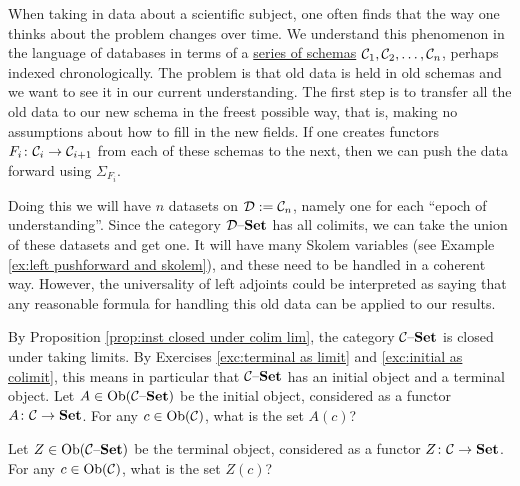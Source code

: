 \documentclass[CT4S-EN-RU]{subfiles}
\begin{document}
\begin{proofRUS}
\end{proofRUS}

\begin{applicationENG}
When taking in data about a scientific subject, one often finds that the way one thinks about the problem changes over time. We understand this phenomenon in the language of databases in terms of a \href{http://en.wikipedia.org/wiki/Schema_evolution}{\text series of schemas} $\mathcal{C}_1,\mathcal{C}_2,\ldots,\mathcal{C}_n$, perhaps indexed chronologically. The problem is that old data is held in old schemas and we want to see it in our current understanding. The first step is to transfer all the old data to our new schema in the freest possible way, that is, making no assumptions about how to fill in the new fields. If one creates functors $F_i\colon\mathcal{C}_i\rightarrow\mathcal{C}_{i+1}$ from each of these schemas to the next, then we can push the data forward using $\Sigma_{F_i}$. 

Doing this we will have $n$ datasets on $\mathcal{D}:=\mathcal{C}_n$, namely one for each “epoch of understanding”. Since the category $\mathcal{D}{\text \textendash}{\mathbf{Set}}$ has all colimits, we can take the union of these datasets and get one. It will have many Skolem variables (see Example \ref{ex:left pushforward and skolem}), and these need to be handled in a coherent way. However, the universality of left adjoints could be interpreted as saying that any reasonable formula for handling this old data can be applied to our results.
\end{applicationENG}

\begin{applicationRUS}
\end{applicationRUS}

\begin{exerciseENG}\label{exc:universal objects in C-set}
By Proposition \ref{prop:inst closed under colim lim}, the category $\mathcal{C}{\text \textendash}{\mathbf{Set}}$ is closed under taking limits. By Exercises \ref{exc:terminal as limit} and \ref{exc:initial as colimit}, this means in particular that $\mathcal{C}{\text \textendash}{\mathbf{Set}}$ has an initial object and a terminal object. 
\sexc Let $A\in\textnormal{Ob}(\mathcal{C}{\text \textendash}{\mathbf{Set}})$ be the initial object, considered as a functor $A\colon\mathcal{C}\rightarrow{\mathbf{Set}}$. For any $c\in\textnormal{Ob}(\mathcal{C})$, what is the set $A(c)$?
\item Let $Z\in\textnormal{Ob}(\mathcal{C}{\text \textendash}{\mathbf{Set}})$ be the terminal object, considered as a functor $Z\colon\mathcal{C}\rightarrow{\mathbf{Set}}$. For any $c\in\textnormal{Ob}(\mathcal{C})$, what is the set $Z(c)$?
\endsexc
\end{exerciseENG}
\end{document}
